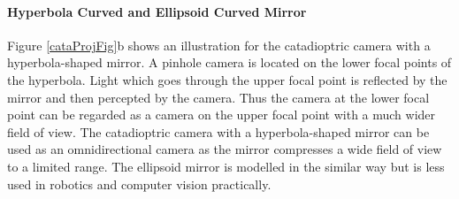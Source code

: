 \documentclass{report}
\begin{document}
\paragraph{Hyperbola Curved and Ellipsoid Curved Mirror} Figure \ref{cataProjFig}b shows an illustration for the catadioptric camera with a hyperbola-shaped mirror. A pinhole camera is located on the lower focal points of the hyperbola. Light which goes through the upper focal point is reflected by the mirror and then percepted by the camera. Thus the camera at the lower focal point can be regarded as a camera on the upper focal point with a much wider field of view. The catadioptric camera with a hyperbola-shaped mirror can be used as an omnidirectional camera as the mirror compresses a wide field of view to a limited range. The ellipsoid mirror is modelled in the similar way but is less used in robotics and computer vision practically. 
\end{document}
